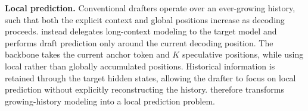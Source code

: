 \textbf{Local prediction.} Conventional drafters operate over an ever-growing history, such that both the explicit context and global positions increase as decoding proceeds. \we instead delegates long-context modeling to the target model and performs draft prediction only around the current decoding position. The backbone takes the current anchor token and \(K\) speculative positions, while using local rather than globally accumulated positions. Historical information is retained through the target hidden states, allowing the drafter to focus on local prediction without explicitly reconstructing the history. \we therefore transforms growing-history modeling into a local prediction problem. 








